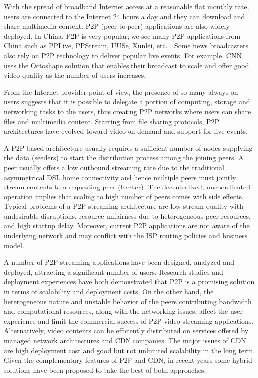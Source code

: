 \documentclass[conference]{IEEEtran}
\begin{document}
With the spread of broadband Internet access at a reasonable flat monthly rate, users are connected to the Internet 24 hours a day and they can download and share multimedia content. P2P (peer to peer) applications are also widely deployed. 
In China, P2P is very popular; we see many P2P applications from China such as PPLive, PPStream, UUSe, Xunlei, etc. \cite{Vu:2010:UOC:1865106.1865115}. 
Some news broadcasters also rely on P2P technology to deliver popular live events. 
For example, CNN uses the Octoshape \cite{octoshape} solution that enables their broadcast to scale and offer good video quality as the number of users increases.

From the Internet provider point of view, the presence of so many always-on users suggests that it is possible to delegate a portion of computing, storage and networking tasks to the users, thus creating P2P networks where users can share files and multimedia content. 
Starting from file sharing protocols, P2P architectures have evolved toward video on demand and support for live events.

A P2P based architecture usually requires a sufficient number of nodes supplying the data (seeders) to start the distribution process among the joining peers.  
A peer usually offers a low outbound streaming rate due to the traditional asymmetrical DSL home connectivity and hence multiple peers must jointly stream contents to a requesting peer (leecher).  
The decentralized, uncoordinated operation implies that scaling to high number of peers comes with side effects.  
Typical problems of a P2P streaming architecture are low stream quality with undesirable disruptions, resource unfairness due to heterogeneous peer resources, and high startup delay.  
Moreover, current P2P applications are not aware of the underlying network and may conflict with the ISP routing policies and business model.

A number of P2P streaming applications have been designed, analyzed and deployed, attracting a significant number of users.  
Research studies and deployment experiences have both demonstrated that P2P is a promising solution in terms of scalability and deployment costs.  
On the other hand, the heterogeneous nature and unstable behavior of the peers contributing bandwidth and computational resources, along with the networking issues, affect the user experience and limit the commercial success of P2P video streaming applications.
Alternatively, video contents can be efficiently distributed on services offered by managed network architectures and CDN companies.
The major issues of CDN are high deployment cost and good but not unlimited scalability in the long term.  
Given the complementary features of P2P and CDN, in recent years some hybrid solutions have been proposed \cite{Huang:2008:UHC:1496046.1496064,4772628,Yin:2009:DDH:1631272.1631279} to take the best of both approaches.
\end{document}

